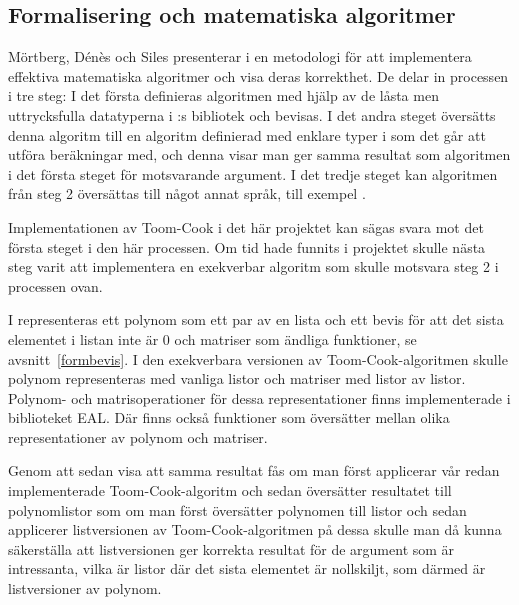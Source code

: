 \subsection{Formalisering och matematiska algoritmer}
\label{sec:exekverbar}
Mörtberg, Dénès och Siles presenterar i \cite{denes2012refinement} en metodologi för att
implementera effektiva matematiska algoritmer och visa deras korrekthet.
De delar in processen i tre steg: I det första definieras algoritmen med hjälp av de
låsta men uttrycksfulla datatyperna i \ssr{}:s bibliotek och bevisas. I det andra
steget översätts denna algoritm till en algoritm definierad med enklare typer i \ssr{}
som det går att utföra beräkningar med, och denna visar man ger samma resultat som
algoritmen i det första steget för motsvarande argument. I det tredje steget kan
algoritmen från steg 2 översättas till något annat språk, till exempel \haskell{}.

Implementationen av Toom-Cook i det här projektet kan sägas svara mot det
första steget i den här processen. Om tid hade funnits i projektet skulle nästa
steg varit att implementera en exekverbar algoritm som skulle motsvara steg 2 i
processen ovan.

I \ssr{} representeras ett polynom som ett par av en lista och ett bevis för
att det sista elementet i listan inte är 0 och matriser som ändliga funktioner,
se avsnitt~\ref{formbevis}. I den exekverbara versionen av Toom-Cook-algoritmen
skulle polynom representeras med vanliga listor och matriser med listor av
listor. Polynom- och matrisoperationer för dessa representationer finns
implementerade i biblioteket \coq{}EAL\cite{coqeal}. Där finns också funktioner
som översätter mellan olika representationer av polynom och matriser.

Genom att sedan visa att samma resultat fås om man först applicerar vår redan
implementerade Toom-Cook-algoritm och sedan översätter resultatet till
polynomlistor som om man först översätter polynomen till listor och sedan
applicerer listversionen av Toom-Cook-algoritmen på dessa skulle man då kunna
säkerställa att listversionen ger korrekta resultat för de argument som är
intressanta, vilka är listor där det sista elementet är nollskiljt, som därmed
är listversioner av polynom.
